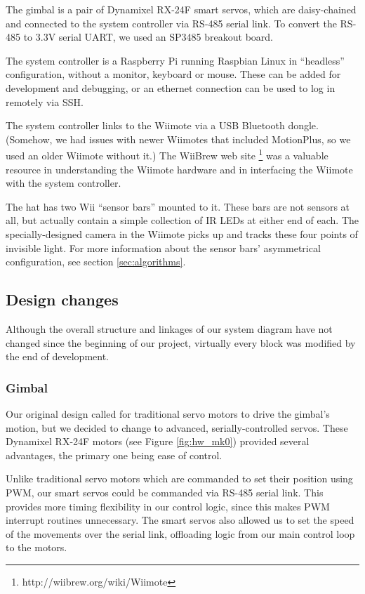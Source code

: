 \documentclass[conference, twocolumn]{IEEEtran}
\begin{document}
The gimbal is a pair of Dynamixel \mbox{RX-24F} smart servos, which are daisy-chained and connected to the system controller via \mbox{RS-485} serial link. To convert the \mbox{RS-485} to 3.3V serial UART, we used an SP3485 breakout board.

The system controller is a Raspberry Pi running Raspbian Linux in ``headless'' configuration, without a monitor, keyboard or mouse. These can be added for development and debugging, or an ethernet connection can be used to log in remotely via SSH.

The system controller links to the Wiimote via a USB Bluetooth dongle. (Somehow, we had issues with newer Wiimotes that included MotionPlus, so we used an older Wiimote without it.) The WiiBrew web site \footnote{http://wiibrew.org/wiki/Wiimote} was a valuable resource in understanding the Wiimote hardware and in interfacing the Wiimote with the system controller.

The hat has two Wii ``sensor bars'' mounted to it. These bars are not sensors at all, but actually contain a simple collection of IR LEDs at either end of each. The specially-designed camera in the Wiimote picks up and tracks these four points of invisible light. For more information about the sensor bars' asymmetrical configuration, see section \ref{sec:algorithms}.

\subsection*{Design changes}
Although the overall structure and linkages of our system diagram have not changed since the beginning of our project, virtually every block was modified by the end of development.

\subsubsection{Gimbal}
Our original design called for traditional servo motors to drive the gimbal's motion, but we decided to change to advanced, serially-controlled servos. These Dynamixel \mbox{RX-24F} motors (see Figure \ref{fig:hw_mk0}) provided several advantages, the primary one being ease of control.

Unlike traditional servo motors which are commanded to set their position using PWM, our smart servos could be commanded via \mbox{RS-485} serial link. This provides more timing flexibility in our control logic, since this makes PWM interrupt routines unnecessary. The smart servos also allowed us to set the speed of the movements over the serial link, offloading logic from our main control loop to the motors.
\end{document}
